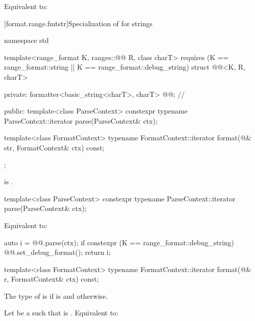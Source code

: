 \begin{itemdescr}
\pnum
\effects
Equivalent to: 
\end{itemdescr}

[format.range.fmtstr]{Specialization of  for strings}

%
\begin{codeblock}
namespace std {
  template<range_format K, ranges::@@ R, class charT>
    requires (K == range_format::string || K == range_format::debug_string)
  struct @@<K, R, charT> {
  private:
    formatter<basic_string<charT>, charT> @@;                  // \expos

  public:
    template<class ParseContext>
      constexpr typename ParseContext::iterator
        parse(ParseContext& ctx);

    template<class FormatContext>
      typename FormatContext::iterator
        format(@\seebelow@& str, FormatContext& ctx) const;
  };
}
\end{codeblock}

\pnum
\mandates
{}
is .

%
\begin{itemdecl}
template<class ParseContext>
  constexpr typename ParseContext::iterator
    parse(ParseContext& ctx);
\end{itemdecl}

\begin{itemdescr}
\pnum
\effects
Equivalent to:
\begin{codeblock}
auto i = @@.parse(ctx);
if constexpr (K == range_format::debug_string) {
  @@.set_debug_format();
}
return i;
\end{codeblock}
\end{itemdescr}

%
\begin{itemdecl}
template<class FormatContext>
  typename FormatContext::iterator
    format(@\seebelow@& r, FormatContext& ctx) const;
\end{itemdecl}

\begin{itemdescr}
\pnum
The type of  is 
if  is  and
 otherwise.

\pnum
\effects
Let  be a  such that
 is .
Equivalent to: 
\end{itemdescr}

